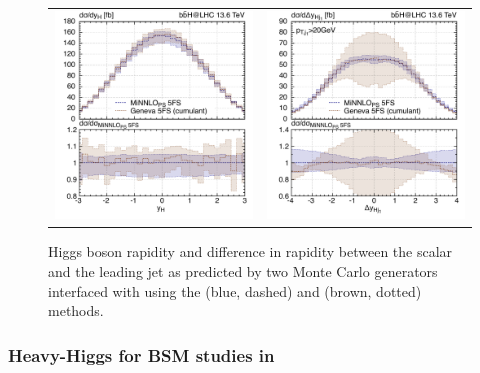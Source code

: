 \documentclass[11pt,a4paper]{article}
\begin{document}
\begin{figure}[h!]
\begin{center}
\begin{tabular}{cc}
\includegraphics[width=.45\textwidth, page=1]{plots/5fs/genevaminnlo/minnloKQvar-geneva-yh.pdf}&
\includegraphics[width=.45\textwidth, page=1]{plots/5fs/genevaminnlo/minnloKQvar-geneva-dyhj.pdf}
\end{tabular}
\vspace*{1ex}
\caption{Higgs boson rapidity and difference in rapidity between the scalar and the leading jet as predicted by two Monte Carlo generators interfaced with  using the \minnlo{} (blue, dashed) and \GENEVA{} (brown, dotted) methods. \label{fig:genevay}}
\end{center}
\end{figure}

\subsubsection{Heavy-Higgs for BSM studies in \minnlo{}}
\end{document}
